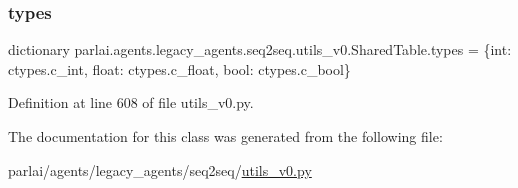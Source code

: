 \subsubsection{\texorpdfstring{types}{types}}
{\footnotesize\ttfamily dictionary parlai.\+agents.\+legacy\+\_\+agents.\+seq2seq.\+utils\+\_\+v0.\+Shared\+Table.\+types = \{int\+: ctypes.\+c\+\_\+int, float\+: ctypes.\+c\+\_\+float, bool\+: ctypes.\+c\+\_\+bool\}\hspace{0.3cm}{\ttfamily [static]}}



Definition at line 608 of file utils\+\_\+v0.\+py.



The documentation for this class was generated from the following file\+:\begin{DoxyCompactItemize}
\item 
parlai/agents/legacy\+\_\+agents/seq2seq/\hyperlink{utils__v0_8py}{utils\+\_\+v0.\+py}\end{DoxyCompactItemize}
